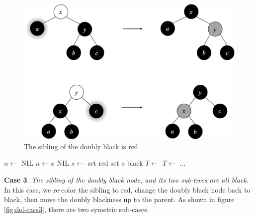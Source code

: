 \documentclass[b5paper]{article}
\begin{document}
\begin{figure}[htbp]
  \centering
  \includegraphics[scale=0.4]{../../../datastruct/tree/red-black-tree/img/del-case3.png}
  \caption{The sibling of the doubly black is red}
  \label{fig:del-case2}
\end{figure}

\begin{algorithmic}[1]
  \State $n \gets$ NIL
    
    \State $n \gets x$
  \EndIf
   
    \State \Return NIL
  \EndIf
        \State $s \gets$ 
           
          \State set  red
          \State set $s$ black
           
            \State $T \gets$ 
          \Else {}
            \State $T \gets$ 
          \EndIf
          \State ...
        \EndIf
    \EndIf
  \EndWhile
\EndFunction
\end{algorithmic}

\textbf{Case 3}. {\em The sibling of the doubly black node, and its two sub-trees are all black.} In this case, we re-color the sibling to red, change the doubly black node back to black, then move the doubly blackness up to the parent. As shown in figure \ref{fig:del-case3}, there are two symetric sub-cases.
\end{document}
